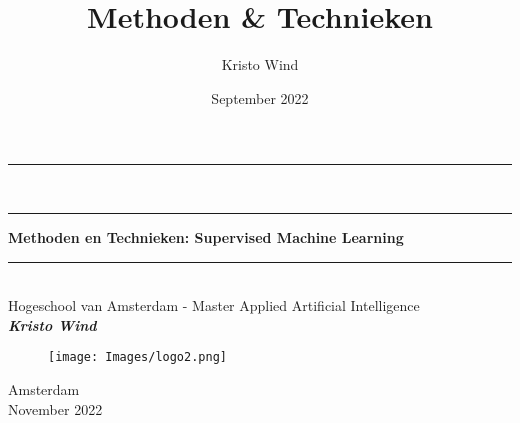 \documentclass{article}
\title{Methoden & Technieken}
\author{Kristo Wind}
\date{September 2022}
\begin{document}
\begin{titlepage}
    \begin{center}
        \begin{minipage}{0.43\textwidth}
        \rule{0.9\linewidth}{0mm}\\
        \vspace{0.5cm}
        \end{minipage}
        
        
\vspace{1cm}
        \rule{\linewidth}{2pt}
        
        \vspace{0.7em} 
        {\LARGE \bfseries Methoden en Technieken: Supervised Machine Learning}
         
        
        \rule{\linewidth}{2pt} \\
        {\sc Hogeschool van Amsterdam  -  Master Applied Artificial Intelligence}\\
    \vspace{8cm}
     {\large \sc  \textit{\textbf{Kristo Wind}}}\vspace{4cm}

   

    \end{center}
    
    \vspace{3.3cm}
    \begin{figure}[htb]
        \centering
        \texttt{[image: Images/logo2.png]}
        \label{fig:hemoglobin3d}
    \end{figure}
    \begin{center}
        \makeatletter
        Amsterdam \\
        November 2022
        \makeatother
    \end{center}
\end{titlepage}

\newpage
\setcounter{page}{1}
\pagestyle{plain}

\pagestyle{fancy}
\fancyhf{}
\cfoot{\thepage}
\fancyhead[L]{\leftmark}
\renewcommand{\footrulewidth}{0.5pt}


\newpage

\newpage
\
\newpage

\newpage

\newpage

\newpage

\newpage

\newpage
\
\newpage

\end{document}
